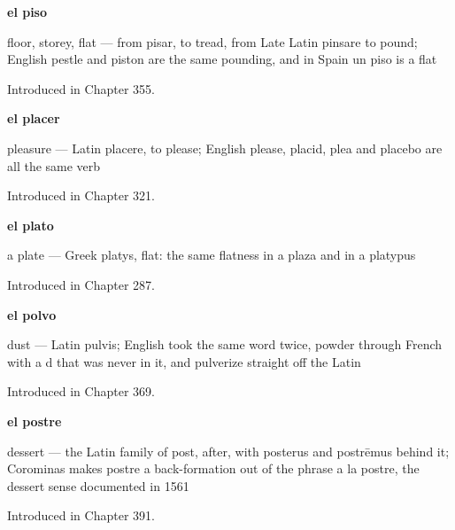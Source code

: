 \noindent\begin{minipage}[t]{\linewidth}
\raggedright
\textbf{el piso}\par
\small floor, storey, flat — from pisar, to tread, from Late Latin pinsare to pound; English pestle and piston are the same pounding, and in Spain un piso is a flat\par
\footnotesize Introduced in Chapter 355.
\end{minipage}\par\medskip

\noindent\begin{minipage}[t]{\linewidth}
\raggedright
\textbf{el placer}\par
\small pleasure — Latin placere, to please; English please, placid, plea and placebo are all the same verb\par
\footnotesize Introduced in Chapter 321.
\end{minipage}\par\medskip

\noindent\begin{minipage}[t]{\linewidth}
\raggedright
\textbf{el plato}\par
\small a plate — Greek platys, flat: the same flatness in a plaza and in a platypus\par
\footnotesize Introduced in Chapter 287.
\end{minipage}\par\medskip

\noindent\begin{minipage}[t]{\linewidth}
\raggedright
\textbf{el polvo}\par
\small dust — Latin pulvis; English took the same word twice, powder through French with a d that was never in it, and pulverize straight off the Latin\par
\footnotesize Introduced in Chapter 369.
\end{minipage}\par\medskip

\noindent\begin{minipage}[t]{\linewidth}
\raggedright
\textbf{el postre}\par
\small dessert — the Latin family of post, after, with posterus and postrēmus behind it; Corominas makes postre a back-formation out of the phrase a la postre, the dessert sense documented in 1561\par
\footnotesize Introduced in Chapter 391.
\end{minipage}\par\medskip

